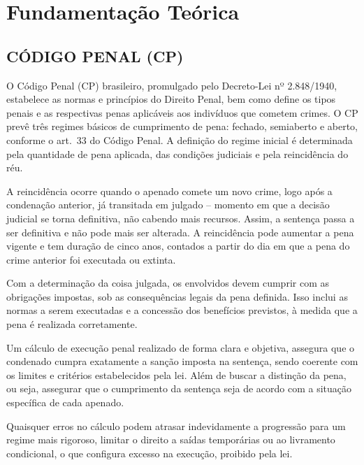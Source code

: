 \chapter{Fundamentação Teórica} \label{cha:fundamentacao}

\section{CÓDIGO PENAL (CP)}
O Código Penal (CP) brasileiro, promulgado pelo Decreto-Lei nº 2.848/1940, estabelece as normas e princípios do Direito Penal, bem como define os tipos penais e as respectivas penas aplicáveis aos indivíduos que cometem crimes. O CP prevê três regimes básicos de cumprimento de pena: fechado, semiaberto e aberto, conforme o art.~33 do Código Penal. A definição do regime inicial é determinada pela quantidade de pena aplicada, das condições judiciais e pela reincidência do réu\cite{codigoPenal}.

A reincidência ocorre quando o apenado comete um novo crime, logo após a condenação anterior, já transitada em julgado – momento em que a decisão judicial se torna definitiva, não cabendo mais recursos. Assim, a sentença passa a ser definitiva e não pode mais ser alterada. A reincidência pode aumentar a pena vigente e tem duração de cinco anos, contados a partir do dia em que a pena do crime anterior foi executada ou extinta.\cite{codigoPenal}

Com a determinação da coisa julgada, os envolvidos devem cumprir com as obrigações impostas, sob as consequências legais da pena definida. Isso inclui as normas a serem executadas e a concessão dos benefícios previstos, à medida que a pena é realizada corretamente.\cite{codigoPenal}

Um cálculo de execução penal realizado de forma clara e objetiva, assegura que o condenado cumpra exatamente a sanção imposta na sentença, sendo coerente com os limites e critérios estabelecidos pela lei. Além de buscar a distinção da pena, ou seja, assegurar que o cumprimento da sentença seja de acordo com a situação específica de cada apenado.\cite{codigoPenal}

Quaisquer erros no cálculo podem atrasar indevidamente a progressão para um regime mais rigoroso, limitar o direito a saídas temporárias ou ao livramento condicional, o que configura excesso na execução, proibido pela lei.\cite{codigoPenal}

